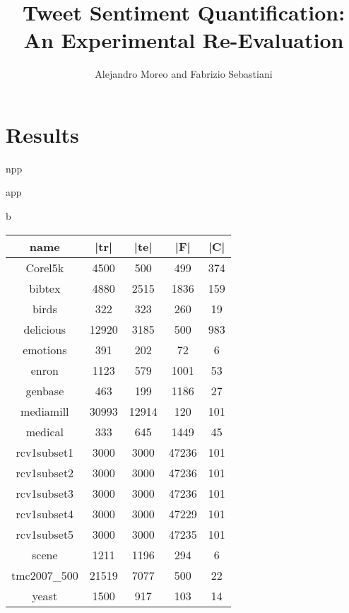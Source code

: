 \documentclass[10pt,a4paper]{article}
\title{Tweet Sentiment Quantification: \\ An Experimental
Re-Evaluation}
\author{Alejandro Moreo and Fabrizio Sebastiani}
\begin{document}
\flushbottom
\maketitle
\thispagestyle{empty}




\section{Results}
\label{sec:results}



\begin{table}[h]
\tiny

    \caption{npp}
    \begin{center}
    \resizebox{\textwidth}{!}{%
        
    }
  \end{center}
  \label{tab:npp}
\end{table}

\begin{table}[h]
\tiny

    \caption{app}
    \begin{center}
    \resizebox{\textwidth}{!}{%
        
    }
  \end{center}
  \label{tab:app}
\end{table}
    
%

\begin{table}{b}
\begin{tabular}{|c||c|c|c|c|}\hline
name & |tr| & |te| & |F| & |C|\\\hline
Corel5k & 4500 & 500 & 499 & 374\\\hline
bibtex & 4880 & 2515 & 1836 & 159\\\hline
birds & 322 & 323 & 260 & 19\\\hline
delicious & 12920 & 3185 & 500 & 983\\\hline
emotions & 391 & 202 & 72 & 6\\\hline
enron & 1123 & 579 & 1001 & 53\\\hline
genbase & 463 & 199 & 1186 & 27\\\hline
mediamill & 30993 & 12914 & 120 & 101\\\hline
medical & 333 & 645 & 1449 & 45\\\hline
rcv1subset1 & 3000 & 3000 & 47236 & 101\\\hline
rcv1subset2 & 3000 & 3000 & 47236 & 101\\\hline
rcv1subset3 & 3000 & 3000 & 47236 & 101\\\hline
rcv1subset4 & 3000 & 3000 & 47229 & 101\\\hline
rcv1subset5 & 3000 & 3000 & 47235 & 101\\\hline
scene & 1211 & 1196 & 294 & 6\\\hline
tmc2007\_500 & 21519 & 7077 & 500 & 22\\\hline
yeast & 1500 & 917 & 103 & 14\\\hline
\end{tabular}
\end{table}
\end{document}
